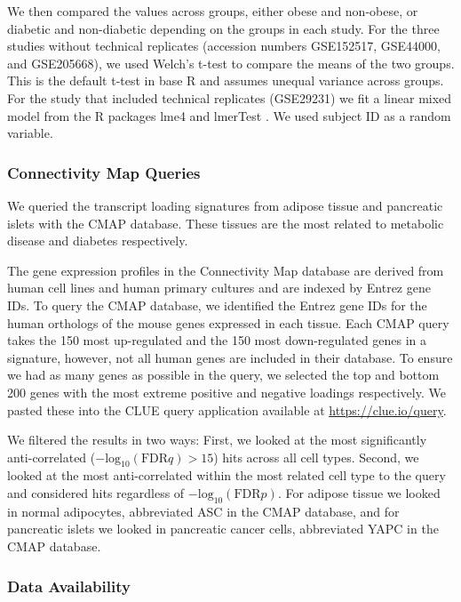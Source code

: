 \documentclass[
]{article}
\begin{document}
We then compared the values across groups, either obese and non-obese,
or diabetic and non-diabetic depending on the groups in each study. For
the three studies without technical replicates (accession numbers
GSE152517, GSE44000, and GSE205668), we used Welch's t-test to compare
the means of the two groups. This is the default t-test in base R and
assumes unequal variance across groups. For the study that included
technical replicates (GSE29231) we fit a linear mixed model from the R
packages lme4 \cite{lme4_package} and lmerTest \cite{lmerTest_package}.
We used subject ID as a random variable.

\subsubsection{Connectivity Map Queries}\label{connectivity-map-queries}

We queried the transcript loading signatures from adipose tissue and
pancreatic islets with the CMAP database. These tissues are the most
related to metabolic disease and diabetes respectively.

The gene expression profiles in the Connectivity Map database are
derived from human cell lines and human primary cultures and are indexed
by Entrez gene IDs. To query the CMAP database, we identified the Entrez
gene IDs for the human orthologs of the mouse genes expressed in each
tissue. Each CMAP query takes the 150 most up-regulated and the 150 most
down-regulated genes in a signature, however, not all human genes are
included in their database. To ensure we had as many genes as possible
in the query, we selected the top and bottom 200 genes with the most
extreme positive and negative loadings respectively. We pasted these
into the CLUE query application available at
\url{https://clue.io/query}.

We filtered the results in two ways: First, we looked at the most
significantly anti-correlated
(\(-\mathrm{log}_{10}(\mathrm{FDR} q) > 15\)) hits across all cell
types. Second, we looked at the most anti-correlated within the most
related cell type to the query and considered hits regardless of
\(-\mathrm{log}_{10}(\mathrm{FDR} p)\). For adipose tissue we looked in
normal adipocytes, abbreviated ASC in the CMAP database, and for
pancreatic islets we looked in pancreatic cancer cells, abbreviated YAPC
in the CMAP database.

\subsubsection{Data Availability}\label{data-availability}
\end{document}

